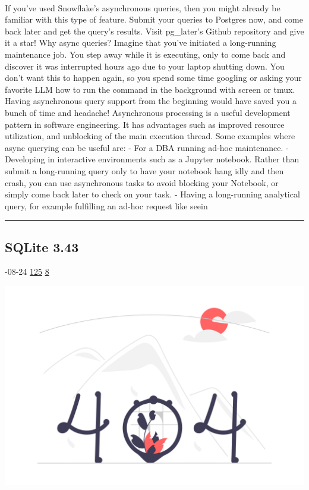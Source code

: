 \documentclass[10pt,a4paper]{article}
\begin{document}
\begin{multicols*}{2}
\paragraph{}
 If you’ve used Snowflake’s asynchronous queries, then you might already be familiar with this type of feature. Submit your queries to Postgres now, and come back later and get the query’s results.
Visit pg\_later’s Github repository and give it a star!
Why async queries?
Imagine that you’ve initiated a long-running maintenance job. You step away while it is executing, only to come back and discover it was interrupted hours ago due to your laptop shutting down. You don’t want this to happen again, so you spend some time googling or asking your favorite LLM how to run the command in the background with screen or tmux. Having asynchronous query support from the beginning would have saved you a bunch of time and headache!
Asynchronous processing is a useful development pattern in software engineering. It has advantages such as improved resource utilization, and unblocking of the main execution thread.
Some examples where async querying can be useful are:
- For a DBA running ad-hoc maintenance.
- Developing in interactive environments such as a Jupyter notebook. Rather than submit a long-running query only to have your notebook hang idly and then crash, you can use asynchronous tasks to avoid blocking your Notebook, or simply come back later to check on your task.
- Having a long-running analytical query, for example fulfilling an ad-hoc request like seein
\par\noindent\textcolor{red}{\rule{\linewidth}{0.2mm}}
\vfill
\null
\noindent\begin{minipage}{\linewidth}
\subsection{SQLite 3.43}
\textsc{\footnotesize
{\scriptsize\faCalendar}-08-24 
{\scriptsize\faThumbsOUp}\space 
\href{http://news.ycombinator.com/item?id=37255022\&utm\_term=comment}{125} 
{\scriptsize\faComments}\space 
\href{http://news.ycombinator.com/item?id=37255022\&utm\_term=comment}{8} 
}
\par\medskip\noindent
\href{https://sqlite.org/releaselog/3\_43\_0.html?utm\_source=hackernewsletter\&utm\_medium=email\&utm\_term=data}{
    \includegraphics[width=0.99\linewidth]{notfound.png}
}
\end{minipage}

\end{multicols*}
\end{document}
